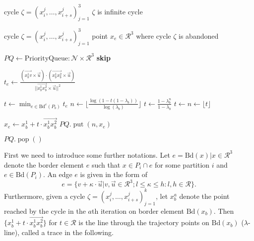 \documentclass[copyright,creativecommons]{packages/eptcs}
\newcommand{\bd}{{\mbox{Bd}}}
\newcommand{\cycle}{\zeta}
\newenvironment{newalgo}[2]{\begin{algorithm}
\caption{\textsc{#1}}\label{#2}
\begin{algorithmic}[1]
\vspace{0.0in}} {\end{algorithmic}\end{algorithm}}
\begin{document}
\begin{newalgo}{Infinity test}{alg:infinity}
  \INPUT cycle $\cycle=(x_{i}^j, \dots, x_{i+s}^j)_{j=1}^3$
  \OUTPUT $\cycle$ is infinite cycle
  
  \medskip
  
  \FORALL{$x_b^j \in \cycle$}
    \FORALL{$e \in \bd(P_b)$}
	    \RETURN \FALSE
	  \ELSE
	      \RETURN \FALSE
	    \ENDIF
	  \ENDIF
	\ENDIF
    \ENDFOR
  \ENDFOR
  
  \RETURN \TRUE
\end{newalgo}
\begin{newalgo}{Exit point}{alg:exit_point}
  \INPUT cycle $\cycle=(x_{i}^j, \dots, x_{i+s}^j)_{j=1}^3$
  \OUTPUT point $x_e \in \mathcal{R}^3$ where cycle $\cycle$ is abandoned
  
 \medskip
  
  \STATE $PQ \leftarrow \mathrm{PriorityQueue}: \mathcal{N} \times \mathcal{R}^3$
  \FORALL{$x_b^j \in \cycle$}
      \STATE \textbf{skip}
    \ENDIF
    
    \FORALL{$e \in \bd^e(P_b)$}
	\STATE $t_e \leftarrow \frac{(\overrightarrow{x_b^1 v} \times \vec{u}) \cdot (\overrightarrow{x_b^1x_b^2} \times \vec{u})}{||\overrightarrow{x_b^1x_b^2} \times \vec{u}||^2}$
    \ENDFOR
    
    \STATE $t \leftarrow \min_{e \in \bd^e(P_b)} t_e$
      \STATE $n \leftarrow \lfloor \frac{\log(1 - t(1 - \lambda_b))}{\log(\lambda_b)} \rfloor$ \STATE $t \leftarrow \frac{1-\lambda_b^n}{1-\lambda_b}$
    \ELSE
      \STATE $t \leftarrow n \leftarrow \lfloor t \rfloor$
    \ENDIF
    
    \STATE $x_e \leftarrow x_b^1 + t \cdot \overrightarrow{x_b^1x_b^2}$ \STATE $PQ.\operatorname{put}(n, x_e)$
  \ENDFOR
  
  \RETURN $PQ.\operatorname{pop}()$
\end{newalgo}


First  we need to introduce some further notations. Let $e = \bd(x) | x \in \mathcal{R}^3$ denote the border element $e$ such that $x \in P_i \cap e$ for some partition $i$ and $e \in \bd(P_i)$. An edge $e$ is given in the form of \[e = \{v + \kappa \cdot \vec{u}| v, \vec{u} \in \mathcal{R}^3; l \leq \kappa \leq h :  l,h \in \mathcal{R}\}.\] Furthermore, given a cycle $\cycle=(x_{i}^j, \dots, x_{i+s}^j)_{j=1}^k$, let $x_{b}^{a}$ denote the point reached by the cycle in the $a$th iteration on border element $\bd(x_b)$. Then $\{ x_b^1 + t \cdot \overrightarrow{x_b^1x_b^2}\}$ for $t \in \mathcal{R}$ is the line through the trajectory points on $\bd(x_b)$ ($\lambda$-line), called a trace in the following.
\end{document}
